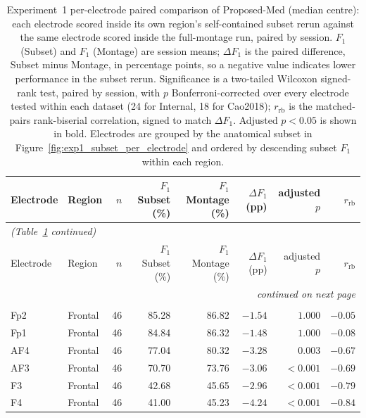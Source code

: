 \onecolumn
\begingroup
\footnotesize
\setlength{\tabcolsep}{4pt}
\begin{longtable}{llrrrrrr}
\caption{Experiment~1 per-electrode paired comparison of Proposed-Med (median centre): each electrode scored inside its own region's self-contained subset rerun against the same electrode scored inside the full-montage run, paired by session. $F_1$ (Subset) and $F_1$ (Montage) are session means; $\Delta F_1$ is the paired difference, Subset minus Montage, in percentage points, so a negative value indicates lower performance in the subset rerun. Significance is a two-tailed Wilcoxon signed-rank test, paired by session, with $p$ Bonferroni-corrected over every electrode tested within each dataset (24 for Internal, 18 for Cao2018); $r_{\mathrm{rb}}$ is the matched-pairs rank-biserial correlation, signed to match $\Delta F_1$. Adjusted $p<0.05$ is shown in bold. Electrodes are grouped by the anatomical subset in Figure~\ref{fig:exp1_subset_per_electrode} and ordered by descending subset $F_1$ within each region.}
\label{tab:exp1_subset_per_electrode_stats} \\
\toprule
Electrode & Region & $n$ & $F_1$ Subset (\%) & $F_1$ Montage (\%) & $\Delta F_1$ (pp) & adjusted $p$ & $r_{\mathrm{rb}}$ \\
\midrule
\endfirsthead
\multicolumn{8}{l}{\textit{(Table~\ref{tab:exp1_subset_per_electrode_stats} continued)}} \\
\toprule
Electrode & Region & $n$ & $F_1$ Subset (\%) & $F_1$ Montage (\%) & $\Delta F_1$ (pp) & adjusted $p$ & $r_{\mathrm{rb}}$ \\
\midrule
\endhead
\midrule
\multicolumn{8}{r}{\textit{continued on next page}} \\
\endfoot
\bottomrule
\endlastfoot
\multicolumn{8}{l}{\textit{Internal (EGI 128, 46 sessions), 24 electrodes tested}} \\[2pt]
Fp2 & Frontal & 46 & 85.28 & 86.82 & $-1.54$ & $1.000$ & $-0.05$ \\
Fp1 & Frontal & 46 & 84.84 & 86.32 & $-1.48$ & $1.000$ & $-0.08$ \\
AF4 & Frontal & 46 & 77.04 & 80.32 & $-3.28$ & $\mathbf{0.003}$ & $-0.67$ \\
AF3 & Frontal & 46 & 70.70 & 73.76 & $-3.06$ & $\mathbf{<0.001}$ & $-0.69$ \\
F3 & Frontal & 46 & 42.68 & 45.65 & $-2.96$ & $\mathbf{<0.001}$ & $-0.79$ \\
F4 & Frontal & 46 & 41.00 & 45.23 & $-4.24$ & $\mathbf{<0.001}$ & $-0.84$ \\

\end{longtable}
